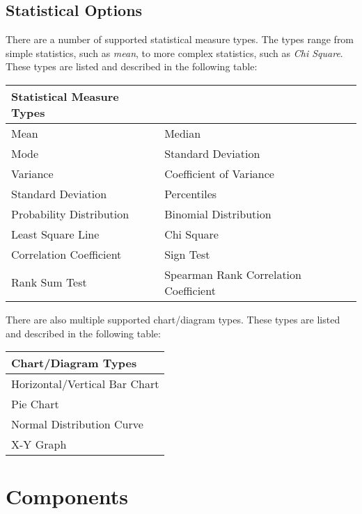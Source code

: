 \documentclass[12pt]{article}
\begin{document}
\subsection{Statistical Options}
There are a number of supported statistical measure types. The types range from
simple statistics, such as \textit{mean}, to more complex statistics, such as
\textit{Chi Square}. These types are listed and described in the following
table:

\begin{center}
\begin{tabularx}{\textwidth}{|X||p{72mm}|}
\hline \textbf{Statistical Measure Types} & \\
\hline Mean & Median \\
\hline Mode & Standard Deviation \\
\hline Variance & Coefficient of Variance \\
\hline Standard Deviation & Percentiles \\
\hline Probability Distribution & Binomial Distribution \\
\hline Least Square Line & Chi Square \\
\hline Correlation Coefficient & Sign Test \\
\hline Rank Sum Test & Spearman Rank Correlation Coefficient \\
\hline
\end{tabularx}
\end{center}

There are also multiple supported chart/diagram types. These types are listed
and described in the following table:

\begin{center}
\begin{tabularx}{\textwidth}{|X|}
\hline \textbf{Chart/Diagram Types} \\
\hline Horizontal/Vertical Bar Chart \\
\hline Pie Chart \\
\hline Normal Distribution Curve \\
\hline X-Y Graph \\
\hline
\end{tabularx}
\end{center}


\section{Components}
\end{document}
